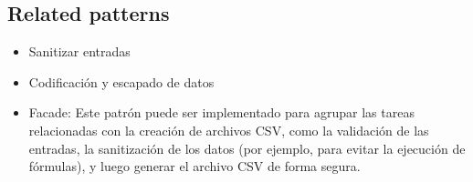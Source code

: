 \subsection{Related patterns}
\begin{itemize}
    \item Sanitizar entradas
    \item Codificación y escapado de datos
    \item Facade: Este patrón puede ser implementado para agrupar las tareas relacionadas con la creación de archivos CSV, como la validación de las entradas, la sanitización de los datos (por ejemplo, para evitar la ejecución de fórmulas), y luego generar el archivo CSV de forma segura.
\end{itemize}